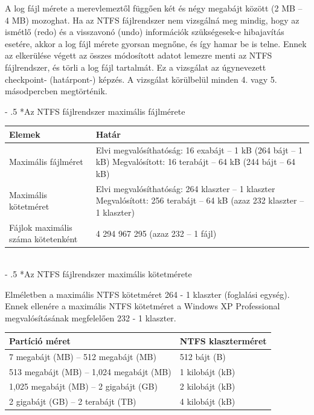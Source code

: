 \documentclass[tikz,12pt,margin=0px]{article}
\makeatletter
\renewcommand\paragraph{%
	\@startsection{paragraph}{4}{0mm}%
	{-\baselineskip}%
	{.5\baselineskip}%
	{\normalfont\normalsize\bfseries}}
\makeatother
\begin{document}
    \noindent A log fájl mérete a merevlemeztől függően két és négy megabájt között (2 MB – 4 MB) mozoghat. Ha az NTFS fájlrendszer nem vizsgálná meg mindig, hogy az ismétlő (redo) és a visszavonó (undo) információk szükségesek-e hibajavítás esetére, akkor a log fájl mérete gyorsan megnőne, és így hamar be is telne. Ennek az elkerülése végett az összes módosított adatot lemezre menti az NTFS fájlrendszer, és törli a log fájl tartalmát. Ez a vizsgálat az úgynevezett checkpoint- (határpont-) képzés. A vizsgálat körülbelül minden 4. vagy 5. másodpercben megtörténik.

    \paragraph*{Az NTFS fájlrendszer maximális fájlmérete}

    \renewcommand{\arraystretch}{2}
    {\footnotesize
      \begin{tabular}{|p{6cm}|p{9cm}|}
      \hline
        \textbf{Elemek} & \textbf{Határ} \\ \hline \hline
        Maximális fájlméret & Elvi megvalósíthatóság: 16 exabájt – 1 kB (264 bájt – 1 kB)
        Megvalósított: 16 terabájt – 64 kB (244 bájt – 64 kB)  \\ \hline
        Maximális kötetméret & Elvi megvalósíthatóság: 264 klaszter – 1 klaszter
        Megvalósított: 256 terabájt – 64 kB (azaz 232 klaszter – 1 klaszter)  \\ \hline
        Fájlok maximális száma kötetenként & 4 294 967 295 (azaz 232 – 1 fájl)  \\ \hline
      \end{tabular}
  }
  \renewcommand{\arraystretch}{1}\\

    \paragraph*{Az NTFS fájlrendszer maximális kötetmérete}

    \noindent Elméletben a maximális NTFS kötetméret 264 - 1 klaszter (foglalási egység). Ennek ellenére a maximális NTFS kötetméret a Windows XP Professional megvalósításának megfelelően 232 - 1 klaszter.\\

    \noindent \renewcommand{\arraystretch}{2}
    {\footnotesize
      \begin{tabular}{|p{6cm}|p{9cm}|}
      \hline
        \textbf{Partíció méret} & \textbf{NTFS klaszterméret} \\ \hline \hline
        7 megabájt (MB) – 512 megabájt (MB) & 512 bájt (B)  \\ \hline
        513 megabájt (MB) – 1,024 megabájt (MB) & 1 kilobájt (kB)  \\ \hline
        1,025 megabájt (MB) – 2 gigabájt (GB) & 2 kilobájt (kB) \\ \hline
        2 gigabájt (GB) – 2 terabájt (TB) & 4 kilobájt (kB) \\ \hline
      \end{tabular}
  }
  \renewcommand{\arraystretch}{1}\\
\end{document}
